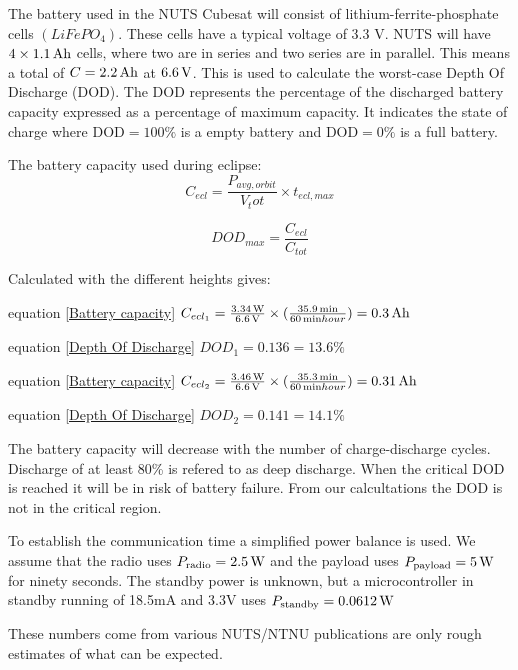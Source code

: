 The battery used in the NUTS Cubesat will consist of lithium-ferrite-phosphate cells $(LiFePO_4)$\cite{Overview of NUTS}. 
These cells have a typical voltage of 3.3 V. NUTS will have $4\times \unit[1.1]{Ah}$ cells, where two are in series and two series are in parallel. This means a total of $C=\unit[2.2]{Ah}$ at $\unit[6.6]{V}$\cite{Satellite Power Systems}. This is used to calculate the worst-case Depth Of Discharge (DOD). The DOD represents the percentage of the discharged battery capacity expressed as a percentage of maximum capacity. It indicates the state of charge where $\text{DOD} = 100\% $ is a empty battery and $\text{DOD}=0\%$ is a full battery.

The battery capacity used during eclipse: 
\begin{equation}
C_{ecl} = \frac{P_{avg,orbit}}{V_tot}\times t_{ecl,max}
\label{Battery capacity}
\end{equation}

 \begin{equation}
DOD_{max} = \frac{C_{ecl}}{C_{tot}}
\label{Depth Of Discharge}
\end{equation}

Calculated with the different heights gives:

equation \ref{Battery capacity}
$C_{ecl_1} = \frac{\unit[3.34]{W}}{\unit[6.6]{V}}\times(\frac{\unit[35.9]{min}}{\unit[60]{min}{hour}}) = \unit[0.3]{Ah}$

equation \ref{Depth Of Discharge}
$DOD_1 = 0.136 = 13.6 \%$

equation \ref{Battery capacity}
$C_{ecl_2} = \frac{\unit[3.46]{W}}{\unit[6.6]{V}}\times(\frac{\unit[35.3]{min}}{\unit[60]{min}{hour}}) = \unit[0.31]{Ah}$

equation \ref{Depth Of Discharge}
$DOD_2 = 0.141 = 14.1\%$

The battery capacity will decrease with the number of charge-discharge cycles. Discharge of at least 80\% is refered to as deep discharge. When the critical DOD is reached it will be in risk of battery failure. From our calcultations the DOD is not in the critical region. 

To establish the communication time a simplified power balance is used. We assume that the radio uses $P_{\text{radio}} = \unit[2.5]{W}$ and the payload uses $P_{\text{payload}} = \unit[5]{W}$  for ninety seconds. The standby power is unknown, but a microcontroller in standby running of 18.5mA and 3.3V uses $P_{\text{standby}} = \unit[0.0612]{W}$ 

These numbers come from various NUTS/NTNU publications are only rough estimates of what can be expected.


